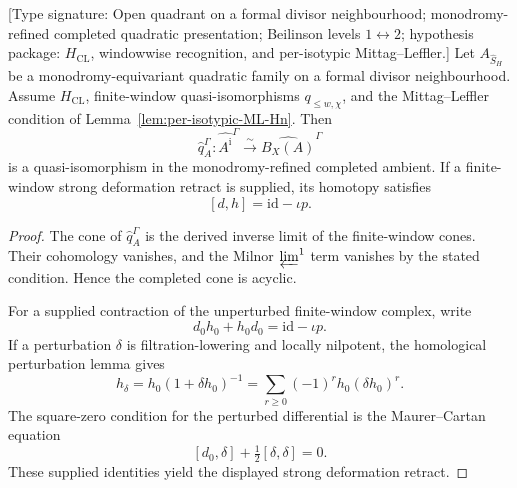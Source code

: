 \begin{theorem}
\label{thm:strict-chain-level-across-humbert-walls}
\textup{[Type signature: Open quadrant on a formal divisor
neighbourhood; monodromy-refined completed quadratic presentation;
Beilinson levels \(1\leftrightarrow2\); hypothesis package:
\(H_{\mathrm{CL}}\), windowwise recognition, and per-isotypic
Mittag--Leffler.]}
Let \(A_{\widehat S_H}\) be a monodromy-equivariant quadratic family
on a formal divisor neighbourhood.  Assume
\(H_{\mathrm{CL}}\), finite-window quasi-isomorphisms
\(q_{\leq w,\chi}\), and the Mittag--Leffler condition of
Lemma~\ref{lem:per-isotypic-ML-Hn}.  Then
\[
 \widehat q_A^\Gamma\colon
 \widehat{A^{\mathrm i}}^\Gamma
 \xrightarrow{\sim}
 \widehat{B_X(A)}^\Gamma
\]
is a quasi-isomorphism in the monodromy-refined completed ambient.
If a finite-window strong deformation retract is supplied, its
homotopy satisfies
\begin{equation}\label{eq:chain-homotopy-identity-humbert}
 [d,h]=\mathrm{id}-\iota p .
\end{equation}
\end{theorem}

\begin{proof}
The cone of \(\widehat q_A^\Gamma\) is the derived inverse limit of
the finite-window cones.  Their cohomology vanishes, and the Milnor
\(\varprojlim^1\) term vanishes by the stated condition.  Hence the
completed cone is acyclic.

For a supplied contraction of the unperturbed finite-window complex,
write
\begin{equation}\label{eq:bar-shift-koszul-splitting}
 d_0h_0+h_0d_0=\mathrm{id}-\iota p .
\end{equation}
If a perturbation \(\delta\) is filtration-lowering and locally
nilpotent, the homological perturbation lemma gives
\begin{equation}\label{eq:curvature-corrected-bott-koszul}
 h_\delta=h_0(1+\delta h_0)^{-1}
 =\sum_{r\geq0}(-1)^rh_0(\delta h_0)^r .
\end{equation}
The square-zero condition for the perturbed differential is the
Maurer--Cartan equation
\begin{equation}\label{eq:mc-integrability-curvature-corrected}
 [d_0,\delta]+\tfrac12[\delta,\delta]=0 .
\end{equation}
These supplied identities yield the displayed strong deformation
retract.
\end{proof}


